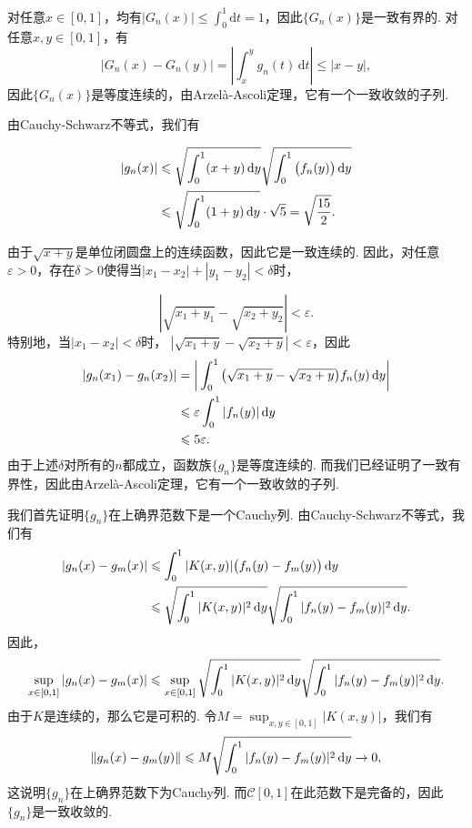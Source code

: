\begin{ans}
  对任意$x\in[0,1]$，均有$|G_n(x)|\le\int_0^1\mathrm dt=1$，因此$\{G_n(x)\}$是一致有界的. 对任意$x,y\in[0,1]$，有
  \[ |G_n(x)-G_n(y)| = | \int_x^yg_n(t)\,\mathrm dt | \le |x-y|, \]
  因此$\{G_n(x)\}$是等度连续的，由Arzel\`a-Ascoli定理，它有一个一致收敛的子列.
\end{ans}

\begin{ans}
  \begin{enumb}
    \item 由Cauchy-Schwarz不等式，我们有
  \end{enumb}
  \begin{align*}
    |g_n(x)| & \leqslant \sqrt{\int_0^1(x+y)\,\mathrm dy}
    \sqrt{\int_0^1\big(f_n(y)\big)\,\mathrm dy} \\
    & \leqslant \sqrt{\int_0^1(1+y)\,\mathrm dy}\cdot\sqrt5
    =\sqrt{\frac{15}2}.
  \end{align*}
  \begin{enumc}\setcounter{enumi}{1}
    \item 由于$\sqrt{x+y}$是单位闭圆盘上的连续函数，因此它是一致连续的. 因此，对任意$\varepsilon>0$，存在$\delta>0$使得当$|x_1-x_2|+|y_1-y_2|<\delta$时，
  \end{enumc}
  \[ |\sqrt{x_1+y_1}-\sqrt{x_2+y_2}|<\varepsilon. \]
  特别地，当$|x_1-x_2|<\delta$时，
  $|\sqrt{x_1+y}-\sqrt{x_2+y}|<\varepsilon$，因此
  \begin{align*}
    |g_n(x_1)-g_n(x_2)| & =
      \bigg| \int_0^1\big( \sqrt{x_1+y}-\sqrt{x_2+y} \big)f_n(y)\,\mathrm dy \bigg|\\
      & \leqslant \varepsilon\int_0^1|f_n(y)|\,\mathrm dy\\
      & \leqslant 5\varepsilon.
  \end{align*}
  由于上述$\delta$对所有的$n$都成立，函数族$\{g_n\}$是等度连续的. 而我们已经证明了一致有界性，因此由Arzel\`a-Ascoli定理，它有一个一致收敛的子列.
\end{ans}

\begin{ans}
  我们首先证明$\{g_n\}$在上确界范数下是一个Cauchy列. 由Cauchy-Schwarz不等式，我们有
  \begin{align*}
    |g_n(x)-g_m(x)| & \leqslant \int_0^1|K(x,y)|
      \big( f_n(y)-f_m(y) \big)\,\mathrm dy \\
      & \leqslant \sqrt{\int_0^1|K(x,y)|^2\,\mathrm dy}
            \sqrt{\int_0^1|f_n(y)-f_m(y)|^2\,\mathrm dy}.
  \end{align*}
  因此，
  \[
    \sup_{x\in[0,1]}|g_n(x)-g_m(x)|
    \le \sup_{x\in[0,1]}
      \sqrt{\int_0^1|K(x,y)|^2\,\dy}
      \sqrt{\int_0^1|f_n(y)-f_m(y)|^2\,\dy}.
  \]
  由于$K$是连续的，那么它是可积的. 令$M=\sup_{x,y\in[0,1]}|K(x,y)|$，我们有
  \[
    \| g_n(x)-g_m(y) \| \leqslant M\sqrt{\int_0^1|f_n(y)-f_m(y)|^2\,\mathrm dy} \to 0,
  \]
  这说明$\{g_n\}$在上确界范数下为Cauchy列. 而$\mathcal C[0,1]$在此范数下是完备的，因此$\{g_n\}$是一致收敛的.
\end{ans}

